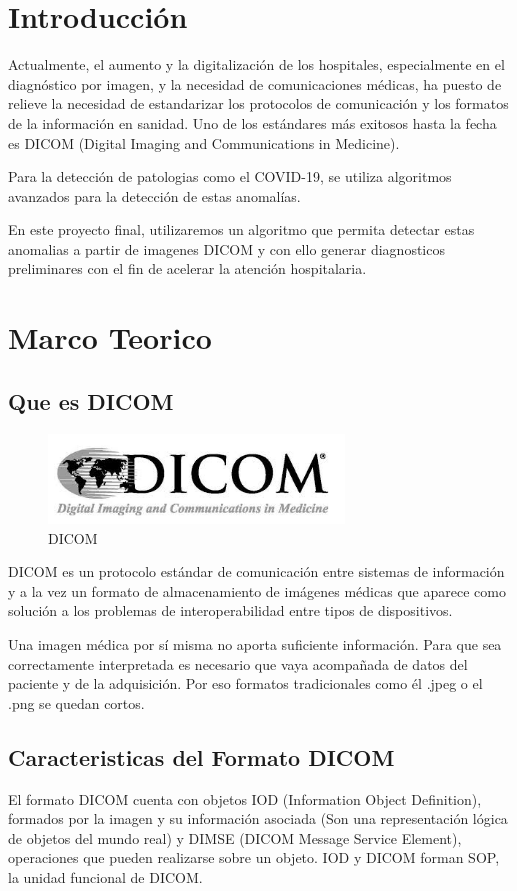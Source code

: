 \documentclass{article}
\begin{document}
\section{Introducción}
   Actualmente, el aumento y la  digitalización de los hospitales, especialmente en el diagnóstico  por imagen, y la necesidad de comunicaciones médicas, ha puesto de relieve la necesidad de estandarizar los protocolos de comunicación y los formatos de la información en sanidad. 
   Uno de los estándares más exitosos hasta la fecha es DICOM (Digital Imaging and Communications in Medicine). 
   
   Para la detección de patologias como el COVID-19, se utiliza algoritmos avanzados para la detección de estas anomalías. 
   
    En este proyecto final, utilizaremos un algoritmo que permita detectar estas anomalias a partir de imagenes DICOM y con ello generar diagnosticos preliminares con el fin de acelerar la atención hospitalaria.

    
\section{Marco Teorico}
\subsection{Que es DICOM}

\begin{figure}[H]
\centering
\includegraphics[width=0.7\textwidth]{img/dicom.jpg}
\caption{DICOM}
\end{figure}


DICOM es un protocolo estándar de comunicación entre sistemas de información y a la vez un formato de almacenamiento de imágenes médicas que aparece como solución a los problemas de interoperabilidad entre tipos de dispositivos.

Una imagen médica por sí misma no aporta suficiente información. Para que sea correctamente interpretada es necesario que vaya acompañada de datos del paciente y de la adquisición. Por eso formatos tradicionales como él .jpeg o el .png se quedan cortos.

\subsection{Caracteristicas del Formato DICOM}
El formato DICOM cuenta con objetos IOD (Information Object Definition), formados por la imagen y su información asociada (Son una representación lógica de objetos del mundo real) y DIMSE (DICOM Message Service Element), operaciones que pueden realizarse sobre un objeto. IOD y DICOM forman SOP, la unidad funcional de DICOM.
\end{document}
